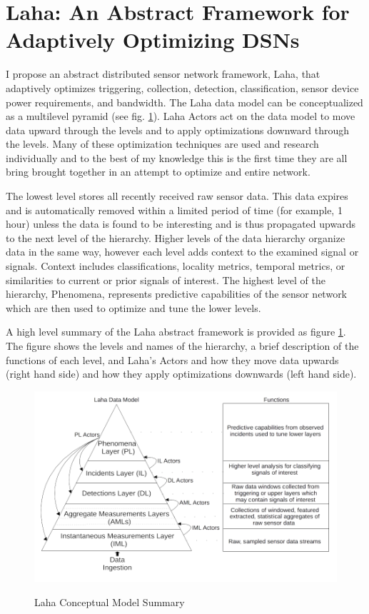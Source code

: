\section{Laha: An Abstract Framework for Adaptively Optimizing DSNs}
I propose an abstract distributed sensor network framework, Laha, that adaptively optimizes triggering, collection, detection, classification, sensor device power requirements, and bandwidth. The Laha data model can be conceptualized as a multilevel pyramid (see fig. \ref{laha-abstract-overview}). Laha Actors act on the data model to move data upward through the levels and to apply optimizations downward through the levels. Many of these optimization techniques are used and research individually and to the best of my knowledge this is the first time they are all bring brought together in an attempt to optimize and entire network.

The lowest level stores all recently received raw sensor data. This data expires and is automatically removed within a limited period of time (for example, 1 hour) unless the data is found to be interesting and is thus propagated upwards to the next level of the hierarchy.  Higher levels of the data hierarchy organize data in the same way, however each level adds context to the examined signal or signals. Context includes classifications, locality metrics, temporal metrics, or similarities to current or prior signals of interest. The highest level of the hierarchy, Phenomena, represents predictive capabilities of the sensor network which are then used to optimize and tune the lower levels.

A high level summary of the Laha abstract framework is provided as figure \ref{laha-abstract-overview}. The figure shows the levels and names of the hierarchy, a brief description of the functions of each level, and Laha's Actors and how they move data upwards (right hand side) and how they apply optimizations downwards (left hand side).

\begin{figure}
	\caption{Laha Conceptual Model Summary}
	\centering
	\includegraphics{figures/laha_abstract_overview.png}
	\label{laha-abstract-overview}
\end{figure}

